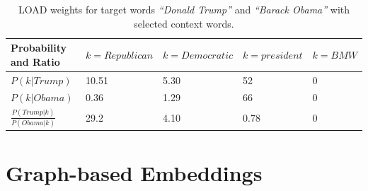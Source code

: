 \begin{table}[]
\centering

\begin{tabular}{@{}l|l|l|l|l@{}}
\toprule
Probability and Ratio&  $k=Republican$& $k=Democratic$ & $k=president$ &$k= BMW$  \\ \midrule
 $P(k|Trump)$& {\color[HTML]{CB0000}10.51} &  {\color[HTML]{329A9D}5.30} & {\color[HTML]{CB0000}52} & {\color[HTML]{329A9D}0} \\\midrule
  $P(k|Obama)$&{\color[HTML]{329A9D}0.36}  & {\color[HTML]{CB0000}1.29} &  {\color[HTML]{CB0000}66}&{\color[HTML]{329A9D}0}  \\\midrule
 $\frac { P(Trump|k) }{ P(Obama|k) } $& {\color[HTML]{CB0000}29.2} &  {\color[HTML]{329A9D}4.10}&  0.78 &    0  \\\midrule
\end{tabular}%

\caption{LOAD weights for target words \emph{``Donald Trump''} and \emph{``Barack Obama''} with selected context words. }
\label{table:tab_2}
\end{table}
\label{sec:components_load}

\section{Graph-based Embeddings }
\label{sec:graph}